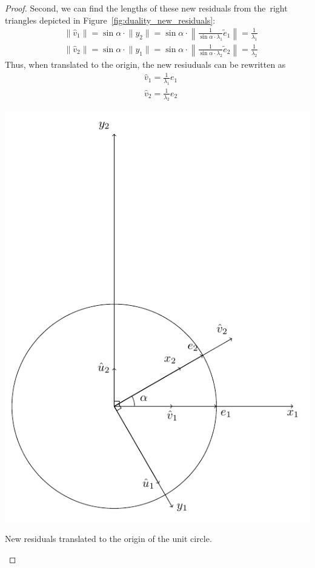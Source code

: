 \begin{proof}
Second, we can find the lengths of these new residuals from the~right
triangles depicted in Figure~\ref{fig:duality_new_residuals}:
\begin{align*}
& \lVert \hat{v}_1 \rVert = \sin \alpha \cdot \lVert y_2 \rVert = \sin \alpha \cdot \left\lVert \frac{1}{\sin \alpha \cdot \lambda_1} \tilde{e}_1 \right\rVert = \frac{1}{\lambda_1} \\
& \lVert \hat{v}_2 \rVert = \sin \alpha \cdot \lVert y_1 \rVert = \sin \alpha \cdot \left\lVert \frac{1}{\sin \alpha \cdot \lambda_2} \tilde{e}_2 \right\rVert = \frac{1}{\lambda_2}
\end{align*}
Thus, when translated to the origin, the new resiuduals can be rewritten as
\begin{align*}
& \hat{v}_1 = \frac{1}{\lambda_1} e_1 \\
& \hat{v}_2 = \frac{1}{\lambda_2} e_2
\end{align*}

\begin{marginfigure}[20\baselineskip]
\includegraphics[scale=0.6]{figures/02_duality_final.pdf}
\label{fig:duality_final}
\caption{New residuals translated to the origin of the unit circle.}
\end{marginfigure}


\end{proof}
